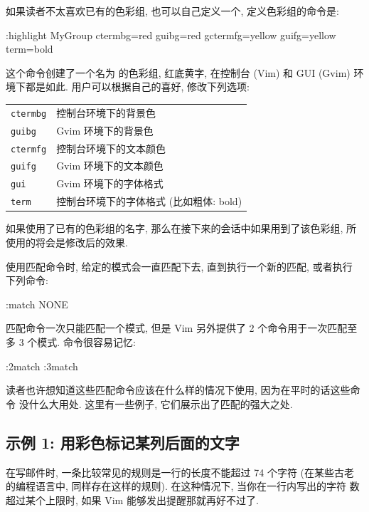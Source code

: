 \begin{warning}
如果读者不太喜欢已有的色彩组, 也可以自己定义一个, 定义色彩组的命令是:
\begin{vimcmd}
:highlight MyGroup ctermbg=red guibg=red gctermfg=yellow
        guifg=yellow term=bold
\end{vimcmd}
这个命令创建了一个名为  的色彩组, 红底黄字, 在控制台 (Vim)
和 GUI (Gvim) 环境下都是如此. 用户可以根据自己的喜好, 修改下列选项:
\begin{tabular}{ll}
    \hline
    \texttt{ctermbg}    & 控制台环境下的背景色 \\
    \texttt{guibg}      & Gvim 环境下的背景色 \\
    \texttt{ctermfg}     & 控制台环境下的文本颜色 \\
    \texttt{guifg}      & Gvim 环境下的文本颜色 \\
    \texttt{gui}        & Gvim 环境下的字体格式 \\
    \texttt{term}       & 控制台环境下的字体格式 (比如粗体: bold) \\
    \hline
\end{tabular}

如果使用了已有的色彩组的名字, 那么在接下来的会话中如果用到了该色彩组,
所使用的将会是修改后的效果.

使用匹配命令时, 给定的模式会一直匹配下去, 直到执行一个新的匹配, 或者执行
下列命令:
\begin{vimcmd}
:match NONE
\end{vimcmd}
匹配命令一次只能匹配一个模式, 但是 Vim 另外提供了 2 个命令用于一次匹配至
多 3 个模式. 命令很容易记忆:
\begin{vimcmd}
:2match
:3match
\end{vimcmd}
读者也许想知道这些匹配命令应该在什么样的情况下使用, 因为在平时的话这些命令
没什么大用处. 这里有一些例子, 它们展示出了匹配的强大之处.

\subsection{示例 1: 用彩色标记某列后面的文字}
\label{subsec:mark_color_characters_after_a_certain}
在写邮件时, 一条比较常见的规则是一行的长度不能超过 74 个字符 (在某些古老
的编程语言中, 同样存在这样的规则). 在这种情况下, 当你在一行内写出的字符
数超过某个上限时, 如果 Vim 能够发出提醒那就再好不过了.


\end{warning}
